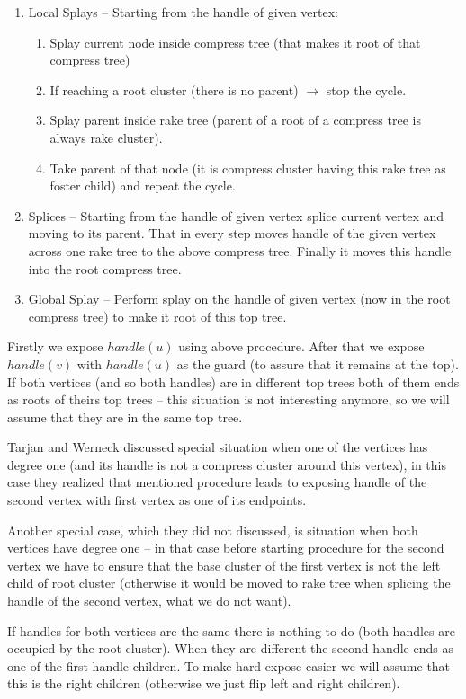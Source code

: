 \begin{enumerate}
\item Local Splays -- Starting from the handle of given vertex:
  \begin{enumerate}
  \item Splay current node inside compress tree (that makes it root of that compress tree)
  \item If reaching a root cluster (there is no parent) $\rightarrow$ stop the cycle.
  \item Splay parent inside rake tree (parent of a root of a compress tree is always rake cluster).
  \item Take parent of that node (it is compress cluster having this rake tree as foster child)
  and repeat the cycle.
  \end{enumerate}
\item Splices -- Starting from the handle of given vertex splice current vertex and
moving to its parent. That in every step moves handle of the given vertex across
one rake tree to the above compress tree. Finally it moves this handle into the
root compress tree.
\item Global Splay -- Perform splay on the handle of given vertex (now in the
root compress tree) to make it root of this top tree.
\end{enumerate}

Firstly we expose $handle(u)$ using above procedure. After that we expose
$handle(v)$ with $handle(u)$ as the guard (to assure that it remains at the
top). If both vertices (and so both handles) are in different top trees both of
them ends as roots of theirs top trees -- this situation is not interesting
anymore, so we will assume that they are in the same top tree.

Tarjan and Werneck discussed special situation when one of the vertices has
degree one (and its handle is not a compress cluster around this vertex), in
this case they realized that mentioned procedure leads to exposing handle of the
second vertex with first vertex as one of its endpoints.

Another special case, which they did not discussed, is situation when both
vertices have degree one -- in that case before starting procedure for the
second vertex we have to ensure that the base cluster of the first vertex is not
the left child of root cluster (otherwise it would be moved to rake tree when
splicing the handle of the second vertex, what we do not want).

If handles for both vertices are the same there is nothing to do (both handles
are occupied by the root cluster). When they are different the second handle
ends as one of the first handle children. To make hard expose easier we will
assume that this is the right children (otherwise we just flip left and right
children).

